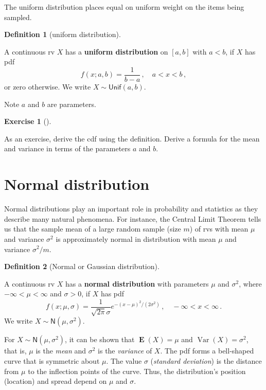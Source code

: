 \documentclass[
  a4paper,
  oneside]{book}
\DeclareMathOperator{\E}{\mathbf{E}}%
\DeclareMathOperator{\Var}{Var}%
\theoremstyle{definition}
\newtheorem{definition}{Definition}[chapter]
\theoremstyle{definition}
\theoremstyle{definition}
\newtheorem{exercise}{Exercise}[chapter]
\theoremstyle{plain}
\theoremstyle{remark}
\begin{document}
The uniform distribution places equal on uniform weight on the items
being sampled.

\begin{definition}[uniform
distribution]\protect\hypertarget{def-uniform-dist}{}\label{def-uniform-dist}

A continuous rv \(X\) has a \textbf{uniform distribution} on \([a,b]\)
with \(a<b\), if \(X\) has pdf \[
 f(x; a,b) = \frac{1}{b-a}\,, 
 \quad a < x < b\,,
\] or zero otherwise. We write \(X \sim \mathsf{Unif}(a,b)\).

\end{definition}

Note \(a\) and \(b\) are parameters.

\begin{exercise}[]\protect\hypertarget{exr-uniform}{}\label{exr-uniform}

As an exercise, derive the cdf using the definition. Derive a formula
for the mean and variance in terms of the parameters \(a\) and \(b\).

\end{exercise}

\section{Normal distribution}\label{sec-normal-distribution}

Normal distributions play an important role in probability and
statistics as they describe many natural phenomena. For instance, the
Central Limit Theorem tells us that the sample mean of a large random
sample (size \(m\)) of rvs with mean \(\mu\) and variance \(\sigma^2\)
is approximately normal in distribution with mean \(\mu\) and variance
\(\sigma^2/m\).

\begin{definition}[Normal or Gaussian
distribution]\protect\hypertarget{def-normal-dist}{}\label{def-normal-dist}

A continuous rv \(X\) has a \textbf{normal distribution} with parameters
\(\mu\) and \(\sigma^2\), where \(-\infty < \mu < \infty\) and
\(\sigma > 0\), if \(X\) has pdf \[
 f(x; \mu, \sigma) = \frac{1}{\sqrt{2 \pi} \sigma}e^{-(x-\mu)^2/(2\sigma^2)}\,, 
 \quad -\infty < x < \infty \,.
\] We write \(X \sim \mathsf{N}(\mu, \sigma^2)\).

\end{definition}

For \(X\sim \mathsf{N}(\mu,\sigma^2)\), it can be shown that
\(\E(X) = \mu\) and \(\Var(X) = \sigma^2\), that is, \(\mu\) is the
\emph{mean} and \(\sigma^2\) is the \emph{variance} of \(X\). The pdf
forms a bell-shaped curve that is symmetric about \(\mu\). The value
\(\sigma\) (\emph{standard deviation}) is the distance from \(\mu\) to
the inflection points of the curve. Thus, the distribution's position
(location) and spread depend on \(\mu\) and \(\sigma\).
\end{document}
